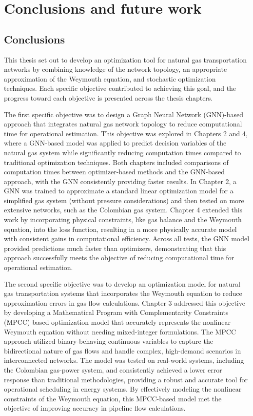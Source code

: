 \chapter{Conclusions and future work}

\section{Conclusions}

This thesis set out to develop an optimization tool for natural gas transportation networks by combining knowledge of the network topology, an appropriate approximation of the Weymouth equation, and stochastic optimization techniques. Each specific objective contributed to achieving this goal, and the progress toward each objective is presented across the thesis chapters.

The first specific objective was to design a Graph Neural Network (GNN)-based approach that integrates natural gas network topology to reduce computational time for operational estimation. This objective was explored in Chapters 2 and 4, where a GNN-based model was applied to predict decision variables of the natural gas system while significantly reducing computation times compared to traditional optimization techniques. Both chapters included comparisons of computation times between optimizer-based methods and the GNN-based approach, with the GNN consistently providing faster results. In Chapter 2, a GNN was trained to approximate a standard linear optimization model for a simplified gas system (without pressure considerations) and then tested on more extensive networks, such as the Colombian gas system. Chapter 4 extended this work by incorporating physical constraints, like gas balance and the Weymouth equation, into the loss function, resulting in a more physically accurate model with consistent gains in computational efficiency. Across all tests, the GNN model provided predictions much faster than optimizers, demonstrating that this approach successfully meets the objective of reducing computational time for operational estimation.

The second specific objective was to develop an optimization model for natural gas transportation systems that incorporates the Weymouth equation to reduce approximation errors in gas flow calculations. Chapter 3 addressed this objective by developing a Mathematical Program with Complementarity Constraints (MPCC)-based optimization model that accurately represents the nonlinear Weymouth equation without needing mixed-integer formulations. The MPCC approach utilized binary-behaving continuous variables to capture the bidirectional nature of gas flows and handle complex, high-demand scenarios in interconnected networks. The model was tested on real-world systems, including the Colombian gas-power system, and consistently achieved a lower error response than traditional methodologies, providing a robust and accurate tool for operational scheduling in energy systems. By effectively modeling the nonlinear constraints of the Weymouth equation, this MPCC-based model met the objective of improving accuracy in pipeline flow calculations.

